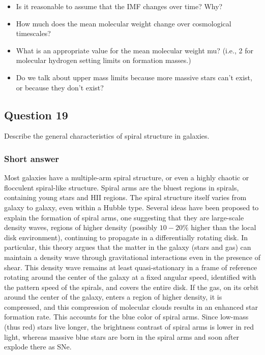 \documentclass[a4paper,10pt]{article}
\begin{document}
\begin{itemize}
    \item Is it reasonable to assume that the IMF changes over time? Why?
    \item How much does the mean molecular weight change over cosmological timescales?
    \item What is an appropriate value for the mean molecular weight mu? (i.e., 2 for molecular hydrogen setting limits on formation masses.)
    \item Do we talk about upper mass limits because more massive stars can't exist, or because they don't exist?
\end{itemize}




\newpage
\subsection{Question 19}

Describe the general characteristics of spiral structure in galaxies.

\subsubsection{Short answer}

Most galaxies have a multiple-arm spiral structure, or even a highly chaotic or flocculent spiral-like  structure. Spiral arms are the bluest regions in spirals, containing young stars and HII regions. The spiral structure itself varies from galaxy to galaxy, even within a Hubble type. Several ideas have been proposed to explain the formation of spiral arms, one suggesting that they are large-scale density waves, regions of higher density (possibly $10-20\%$ higher than the local disk environment), continuing to propagate in a differentially rotating disk. In particular, this theory argues that the matter in the galaxy (stars and gas) can maintain a density wave through gravitational interactions even in the presence of shear. This density wave remains at least quasi-stationary in a frame of reference rotating around the center of the galaxy at a fixed angular speed, identified with the pattern speed of the spirals, and covers the entire disk. If the gas, on its orbit around the center of the galaxy, enters a region of higher density, it is compressed, and this compression of molecular clouds results in an enhanced star formation rate.  This accounts for the blue color of spiral arms. Since low-mass (thus red) stars live longer, the brightness contrast of spiral arms is lower in red light, whereas massive blue stars are born in the spiral arms and soon after explode there as SNe.
\end{document}
